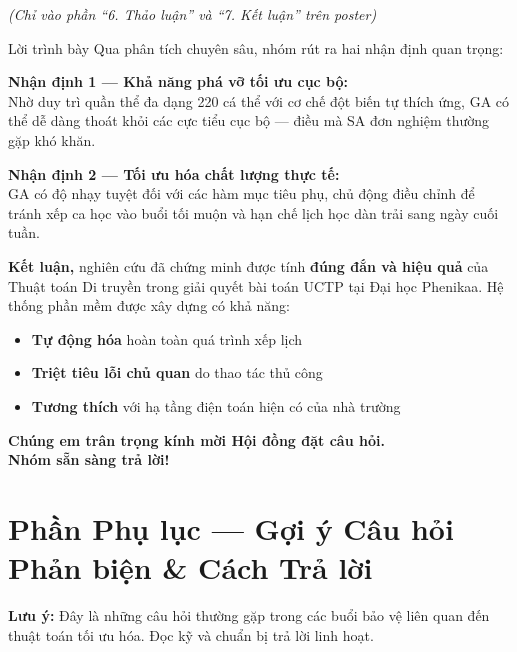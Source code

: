 \documentclass[12pt, a4paper]{article}
\begin{document}
\textit{(Chỉ vào phần ``6. Thảo luận'' và ``7. Kết luận'' trên poster)}

\begin{scriptbox}{Lời trình bày}
Qua phân tích chuyên sâu, nhóm rút ra hai nhận định quan trọng:

\medskip
\textbf{Nhận định 1 --- Khả năng phá vỡ tối ưu cục bộ:}\\
Nhờ duy trì quần thể đa dạng 220 cá thể với cơ chế đột biến tự thích ứng, GA có thể dễ dàng thoát khỏi các cực tiểu cục bộ --- điều mà SA đơn nghiệm thường gặp khó khăn.

\medskip
\textbf{Nhận định 2 --- Tối ưu hóa chất lượng thực tế:}\\
GA có độ nhạy tuyệt đối với các hàm mục tiêu phụ, chủ động điều chỉnh để tránh xếp ca học vào buổi tối muộn và hạn chế lịch học dàn trải sang ngày cuối tuần.

\bigskip
\textbf{Kết luận,} nghiên cứu đã chứng minh được tính \textbf{đúng đắn và hiệu quả} của Thuật toán Di truyền trong giải quyết bài toán UCTP tại Đại học Phenikaa. Hệ thống phần mềm được xây dựng có khả năng:
\begin{itemize}[leftmargin=1.5cm, itemsep=3pt]
  \item \textbf{Tự động hóa} hoàn toàn quá trình xếp lịch
  \item \textbf{Triệt tiêu lỗi chủ quan} do thao tác thủ công
  \item \textbf{Tương thích} với hạ tầng điện toán hiện có của nhà trường
\end{itemize}

\bigskip
\begin{center}
  \textbf{\large Chúng em trân trọng kính mời Hội đồng đặt câu hỏi.\\[0.2em] Nhóm sẵn sàng trả lời!}
\end{center}
\end{scriptbox}

\newpage
\section{Phần Phụ lục — Gợi ý Câu hỏi Phản biện \& Cách Trả lời}

\begin{notebox}
  \textbf{Lưu ý:} Đây là những câu hỏi thường gặp trong các buổi bảo vệ liên quan đến thuật toán tối ưu hóa. Đọc kỹ và chuẩn bị trả lời linh hoạt.
\end{notebox}
\end{document}
